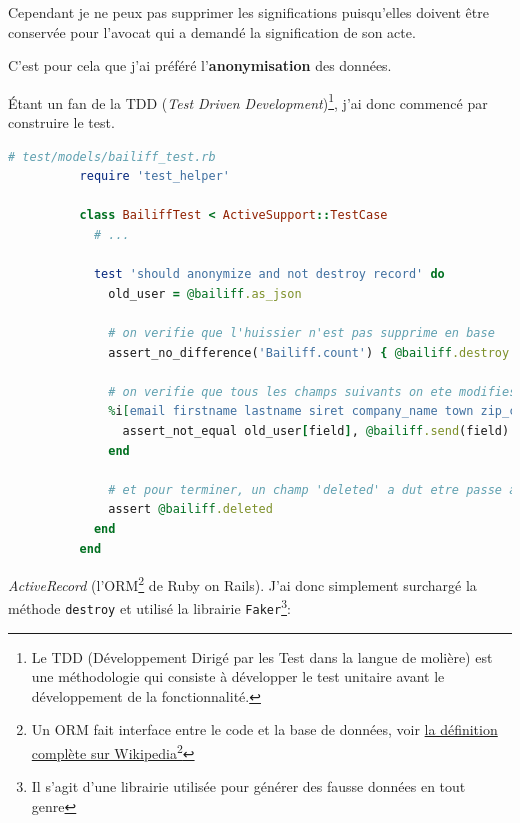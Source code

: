 \documentclass[]{report}
\newcommand\fnurl[2]{%
  \href{#1}{#2}\footnote{\url{#1}}%
}
\begin{document}
        Cependant je ne peux pas supprimer les significations puisqu'elles doivent être conservée pour l'avocat qui a demandé la signification de son acte.

        C'est pour cela que j'ai préféré l'\textbf{anonymisation} des données.

        Étant un fan de la TDD (\textit{Test Driven Development})\footnote{Le TDD (Développement Dirigé par les Test dans la langue de molière) est une méthodologie qui consiste à développer le test unitaire avant le développement de la fonctionnalité.}, j'ai donc commencé par construire le test.

        \begin{scriptsize}
          \begin{lstlisting}[language=ruby]
          # test/models/bailiff_test.rb
          require 'test_helper'

          class BailiffTest < ActiveSupport::TestCase
            # ...

            test 'should anonymize and not destroy record' do
              old_user = @bailiff.as_json

              # on verifie que l'huissier n'est pas supprime en base
              assert_no_difference('Bailiff.count') { @bailiff.destroy }

              # on verifie que tous les champs suivants on ete modifies
              %i[email firstname lastname siret company_name town zip_code address_2 address_1].each do |field|
                assert_not_equal old_user[field], @bailiff.send(field)
              end

              # et pour terminer, un champ 'deleted' a dut etre passe a 'true'
              assert @bailiff.deleted
            end
          end
          \end{lstlisting}
        \end{scriptsize}


        \textit{ActiveRecord} (l'ORM\footnote{Un ORM fait interface entre le code et la base de données, voir \fnurl{https://fr.wikipedia.org/wiki/Mapping_objet-relationnel}{la définition complète sur Wikipedia}} de Ruby on Rails). J'ai donc simplement surchargé la méthode \verb|destroy| et utilisé la librairie \verb|Faker|\footnote{Il s'agit d'une librairie utilisée pour générer des fausse données en tout genre}:
\end{document}
